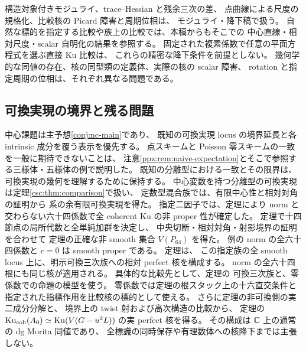 構造対象付きモジュライ、trace--Hessian と残余三次の差、
点曲線による尺度の規格化、比較核の Picard 障害と周期位相は、
モジュライ・降下稿\cite{NCCubicModuliDescent}で扱う。
自然な標的を指定する比較や族上の比較では、本稿からもそこでの
中心直線・相対尺度・scalar 自明化の結果を参照する。
固定された複素係数で任意の平面方程式を選ぶ直接 Ku 比較は、
これらの精密な降下条件を前提としない。
幾何学的な同値の存在、核の同型類の定義体、実際の核の scalar 障害、
rotation と指定周期の位相は、それぞれ異なる問題である。

\subsection{可換実現の境界と残る問題}

中心課題は主予想\ref{conj:nc-main}であり、
既知の可換実現 locus の境界延長と各 intrinsic 成分を覆う表示を優先する。
点スキームと Poisson 零スキームの一致を一般に期待できないことは、
注意\ref{ppz:rem:naive-expectation}とそこで参照する三様体・五様体の例で説明した。
既知の分離型における一致とその限界は、可換実現の幾何を理解するために保持する。
中心変数を持つ分離型の可換実現は定理\ref{csc:thm:comparison}で扱い、
定数型混合族では、有限中心性と相対対角の証明から
系の余有限可換実現を得た。
指定二因子では、定理により
norm と交わらない六十四係数で全 coherent Ku の非 proper 性が確定した。
定理で十四節点の局所代数と全単純加群を決定し、
中央切断・相対対角・射影境界の証明を合わせて
定理の正確な非 smooth 集合 $V(P_{64})$ を得た。
例の norm の全六十四係数と $c=0$ は smooth proper である。
定理は、
この指定族の全 smooth locus 上に、明示可換三次族への相対 perfect 核を構成する。
norm の全六十四根にも同じ核が適用される。
具体的な比較先として、定理の
可換三次族と、零係数での命題の模型を使う。
零係数では定理の根スタック上の十六直交条件と
指定された指標作用を比較核の標的として使える。
さらに定理の非可換側の実二成分分解と、
境界上の twist 射および高次構造の比較から、
定理の
$\operatorname{Ku}_{\mathrm{coh}}(A_0)\simeq\operatorname{Ku}(V(G-u^2L))$ の実 perfect 核を得る。
その構成は $\mathbb C$ 上の通常の dg Morita 同値であり、
全標識の同時保存や有理数体への核降下までは主張しない。
